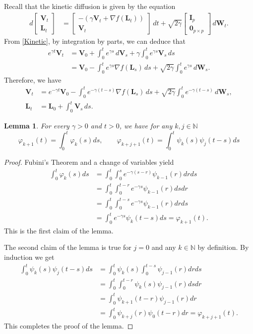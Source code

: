 \documentclass[a4paper,bej,preprint,reqno]{imsart}
\newcommand\bL{\boldsymbol L}
\newcommand\bW{\boldsymbol W}
\newcommand\bV{\boldsymbol V}
\newcommand\bfI{\mathbf I}
\newtheorem{lemma}{Lemma}
\begin{document}
Recall that the kinetic diffusion is given by the equation
\begin{align}\label{Kinetic}
    d
		\begin{bmatrix}
		\bV_t\\
		\bL_t
		\end{bmatrix}
		&=
		\begin{bmatrix}
		-(\gamma \bV_t + \nabla f(\bL_t))\\
		\bV_t
		\end{bmatrix}
		\,dt+\sqrt{2\gamma}
		\begin{bmatrix}
		\bfI_p\\
		\mathbf 0_{p\times p}
		\end{bmatrix}
		\,d\bW_t.
\end{align}
From \eqref{Kinetic}, by integration by parts, we can deduce that
\begin{align}
e^{\gamma t}\bV_t
		&= \bV_0 + \int_0^t e^{\gamma s}\,d\bV_s+\gamma\int_0^t e^{\gamma s}\bV_s\,ds
		\\
		&= \bV_0 - \int_0^t e^{\gamma s}\nabla f(\bL_s)\,ds+\sqrt{2\gamma }
		\int_0^t e^{\gamma s}\,d\bW_s.
\end{align}
Therefore, we have
\begin{align}
\bV_t
		&= e^{-\gamma t}\bV_0 -  \int_0^t e^{-\gamma (t-s)} \nabla f(\bL_s)\,ds+
		\sqrt{2\gamma}\int_0^t e^{-\gamma (t-s)}\,d\bW_s,\label{Vt}\\
\bL_t &= \bL_0 + \int_0^t \bV_s\,ds.		\label{Lt}
\end{align}
\begin{lemma}
For every $\gamma>0$ and $t>0$, we have for any $k,j\in\mathbb{N}$
$$
\varphi_{k+1}(t)=\int_0^t\varphi_k(s)ds,\qquad\varphi_{k+j+1}(t)=\int_0^t \psi_k(s)\psi_j(t-s)ds
$$
\end{lemma}
\begin{proof}Fubini's Theorem and a change of variables yield
\begin{align}
\int_0^t\varphi_k(s)ds&=\int_0^t\int_0^se^{-\gamma(s-r)}\psi_{k-1}(r)drds\\
&=\int_0^t\int_0^{t-r}e^{-\gamma s}\psi_{k-1}(r)dsdr\\
&=\int_0^t\int_0^{t-s}e^{-\gamma s}\psi_{k-1}(r)drds\\
&=\int_0^te^{-\gamma s}\psi_{k}(t-s)ds=\varphi_{k+1}(t).
\end{align}
This is the first claim of the lemma.

The second claim of the lemma is true for $j=0$ and any $k\in\mathbb{N}$ by definition. By induction we get
\begin{align}
\int_0^t\psi_k(s)\psi_j(t-s)ds&=\int_0^t\psi_k(s)\int_0^{t-s}\psi_{j-1}(r)drds\\
&=\int_0^t\int_0^{t-r}\psi_k(s)\psi_{j-1}(r)dsdr\\
&=\int_0^t\psi_{k+1}(t-r)\psi_{j-1}(r)dr\\
&=\int_0^t\psi_{k+j}(r)\psi_0(t-r)dr=\varphi_{k+j+1}(t).
\end{align}
This completes the proof of the lemma.
\end{proof}
\end{document}
